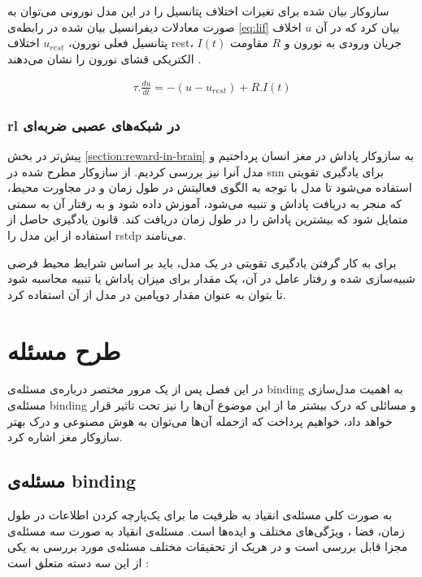 \documentclass[12pt]{report}
\begin{document}
	ساز‌وکار بیان شده برای تغیرات اختلاف پتانسیل را در این مدل نورونی می‌توان به صورت معادلات دیفرانسیل بیان شده در رابطه‌ی \ref{eq:lif} بیان کرد که در آن $u$ اخلاف پتانسیل فعلی نورون، $u_{rest}$ اختلاف \gls{rest}، $I(t)$ جریان ورودی به نورون و $R$ مقاومت الکتریکی قشای نورون را نشان می‌دهند
	\cite{gerstner2014neuronal}.
	
	\begin{align}
		\tau . \frac{du}{dt} = -(u - u_{rest}) + R . I(t) 
		\label{eq:lif}
	\end{align}

	\subsection{\gls{rl} در شبکه‌های عصبی ضربه‌ای}
	
	پیش‌تر در بخش \ref{section:reward-in-brain} به سازوکار پاداش در مغز انسان پرداختیم و مدل آنرا نیز بررسی کردیم. از سازوکار مطرح شده در \gls{snn} برای یادگیری تقویتی استفاده می‌شود تا مدل با توجه به الگوی فعالیتش در طول زمان و در مجاورت محیط، که منجر به دریافت پاداش و تنبیه می‌شود، آموزش داده شود و به رفتار آن به سمتی متمایل شود که بیشترین پاداش را در طول زمان دریافت کند. قانون یادگیری حاصل از استفاده از این مدل را \gls{rstdp} می‌نامند.
	
	برای به کار گرفتن یادگیری تقویتی در یک مدل، باید بر اساس شرایط محیط فرضی شبیه‌سازی شده و رفتار عامل در آن، یک مقدار برای میزان پاداش یا تنبیه محاسبه شود تا بتوان به عنوان مقدار دوپامین در مدل از آن استفاده کرد.
 	
	
	\chapter{طرح مسئله}
	
	در این فصل پس از یک مرور مختصر درباره‌ی مسئله‌ی \gls{binding} به اهمیت مدل‌سازی مسئله‌ی \gls{binding} و مسائلی که درک بیشتر ما از این موضوع آن‌ها را نیز تحت تاثیر قرار خواهد داد، خواهیم پرداخت که از‌جمله آن‌ها می‌توان به هوش مصنوعی و درک بهتر ساز‌وکار مغز اشاره کرد.
	
	\section{مسئله‌ی \gls{binding}}
	
	به صورت کلی مسئله‌ی انقیاد به ظرفیت ما برای یک‌پارچه کردن اطلاعات در طول زمان، فضا ، ویژگی‌های مختلف و ایده‌ها است. مسئله‌ی انقیاد به صورت سه مسئله‌ی مجزا قابل بررسی است و در هریک از تحقیقات مختلف مسئله‌ی مورد بررسی به یکی از این سه دسته متعلق است \cite{Treisman1999}:
	
\end{document}
